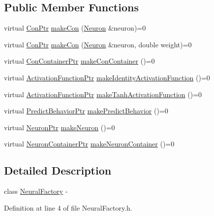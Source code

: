 \subsection*{Public Member Functions}
\begin{DoxyCompactItemize}
\item 
virtual \hyperlink{_a_m_o_r_e_8h_a169bb8e5f26ce70bf2b10dec2fb5ee50}{ConPtr} \hyperlink{class_neural_factory_a2e156aff271f0c6c134a8bad7d164f73}{makeCon} (\hyperlink{class_neuron}{Neuron} \&neuron)=0
\item 
virtual \hyperlink{_a_m_o_r_e_8h_a169bb8e5f26ce70bf2b10dec2fb5ee50}{ConPtr} \hyperlink{class_neural_factory_a0d11171bb9e5d09544e8d58a9324b923}{makeCon} (\hyperlink{class_neuron}{Neuron} \&neuron, double weight)=0
\item 
virtual \hyperlink{_a_m_o_r_e_8h_a1021dbaf961d1c8da6d58a8566e5778b}{ConContainerPtr} \hyperlink{class_neural_factory_a4fa5f4f57a2551c95481146b1a0c83d7}{makeConContainer} ()=0
\item 
virtual \hyperlink{_a_m_o_r_e_8h_a77602a0277a02e5769c3df0adc669b17}{ActivationFunctionPtr} \hyperlink{class_neural_factory_a2a2c7aa8f4d073126f468f676ea68272}{makeIdentityActivationFunction} ()=0
\item 
virtual \hyperlink{_a_m_o_r_e_8h_a77602a0277a02e5769c3df0adc669b17}{ActivationFunctionPtr} \hyperlink{class_neural_factory_a7551643129b608ea6601cd18f2bfb011}{makeTanhActivationFunction} ()=0
\item 
virtual \hyperlink{_a_m_o_r_e_8h_a1fb2f1f8fdf1e08c42ef4bdce436af93}{PredictBehaviorPtr} \hyperlink{class_neural_factory_a1afe8d8d674aad726337295f46b75810}{makePredictBehavior} ()=0
\item 
virtual \hyperlink{_a_m_o_r_e_8h_ac1ea936c2c7728eb382278131652fef4}{NeuronPtr} \hyperlink{class_neural_factory_a7921519c79b2fb0a5868661fe934f694}{makeNeuron} ()=0
\item 
virtual \hyperlink{_a_m_o_r_e_8h_a6157c259718f98f808c85d7f77048970}{NeuronContainerPtr} \hyperlink{class_neural_factory_ab8fe3634f3715f99616fe9498a29badb}{makeNeuronContainer} ()=0
\end{DoxyCompactItemize}


\subsection{Detailed Description}
class \hyperlink{class_neural_factory}{NeuralFactory} -\/ 

Definition at line 4 of file NeuralFactory.h.



